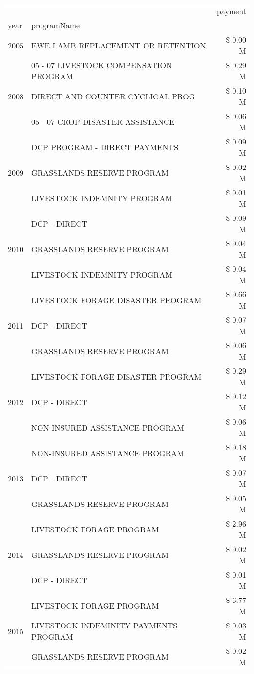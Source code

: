 \begin{tabular}{llr}
\toprule
 &  & payment \\
year & programName &  \\
\midrule
2005 & EWE LAMB REPLACEMENT OR RETENTION & \$ 0.00 M \\
\cline{1-3}
\multirow[t]{3}{*}{2008} & 05 - 07 LIVESTOCK COMPENSATION PROGRAM & \$ 0.29 M \\
 & DIRECT AND COUNTER CYCLICAL PROG & \$ 0.10 M \\
 & 05 - 07 CROP DISASTER ASSISTANCE & \$ 0.06 M \\
\cline{1-3}
\multirow[t]{3}{*}{2009} & DCP PROGRAM - DIRECT PAYMENTS & \$ 0.09 M \\
 & GRASSLANDS RESERVE PROGRAM & \$ 0.02 M \\
 & LIVESTOCK INDEMNITY PROGRAM & \$ 0.01 M \\
\cline{1-3}
\multirow[t]{3}{*}{2010} & DCP - DIRECT & \$ 0.09 M \\
 & GRASSLANDS RESERVE PROGRAM & \$ 0.04 M \\
 & LIVESTOCK INDEMNITY PROGRAM & \$ 0.04 M \\
\cline{1-3}
\multirow[t]{3}{*}{2011} & LIVESTOCK FORAGE DISASTER PROGRAM & \$ 0.66 M \\
 & DCP - DIRECT & \$ 0.07 M \\
 & GRASSLANDS RESERVE PROGRAM & \$ 0.06 M \\
\cline{1-3}
\multirow[t]{3}{*}{2012} & LIVESTOCK FORAGE DISASTER PROGRAM & \$ 0.29 M \\
 & DCP - DIRECT & \$ 0.12 M \\
 & NON-INSURED ASSISTANCE PROGRAM & \$ 0.06 M \\
\cline{1-3}
\multirow[t]{3}{*}{2013} & NON-INSURED ASSISTANCE PROGRAM & \$ 0.18 M \\
 & DCP - DIRECT & \$ 0.07 M \\
 & GRASSLANDS RESERVE PROGRAM & \$ 0.05 M \\
\cline{1-3}
\multirow[t]{3}{*}{2014} & LIVESTOCK FORAGE PROGRAM & \$ 2.96 M \\
 & GRASSLANDS RESERVE PROGRAM & \$ 0.02 M \\
 & DCP - DIRECT & \$ 0.01 M \\
\cline{1-3}
\multirow[t]{3}{*}{2015} & LIVESTOCK FORAGE PROGRAM & \$ 6.77 M \\
 & LIVESTOCK INDEMINITY PAYMENTS PROGRAM & \$ 0.03 M \\
 & GRASSLANDS RESERVE PROGRAM & \$ 0.02 M \\

\end{tabular}
